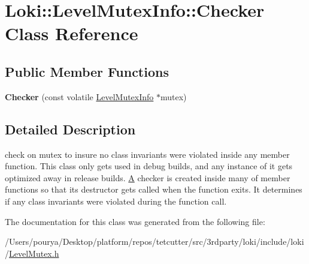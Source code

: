 \hypertarget{classLoki_1_1LevelMutexInfo_1_1Checker}{}\section{Loki\+:\+:Level\+Mutex\+Info\+:\+:Checker Class Reference}
\label{classLoki_1_1LevelMutexInfo_1_1Checker}
\subsection*{Public Member Functions}
\begin{DoxyCompactItemize}
\item 
\hypertarget{classLoki_1_1LevelMutexInfo_1_1Checker_a6f9ea9304ed3c44caf6e8553b77bd21c}{}{\bfseries Checker} (const volatile \hyperlink{classLoki_1_1LevelMutexInfo}{Level\+Mutex\+Info} $\ast$mutex)\label{classLoki_1_1LevelMutexInfo_1_1Checker_a6f9ea9304ed3c44caf6e8553b77bd21c}

\end{DoxyCompactItemize}


\subsection{Detailed Description}
check on mutex to insure no class invariants were violated inside any member function. This class only gets used in debug builds, and any instance of it gets optimized away in release builds. \hyperlink{structA}{A} checker is created inside many of member functions so that it\textquotesingle{}s destructor gets called when the function exits. It determines if any class invariants were violated during the function call. 

The documentation for this class was generated from the following file\+:\begin{DoxyCompactItemize}
\item 
/\+Users/pourya/\+Desktop/platform/repos/tetcutter/src/3rdparty/loki/include/loki/\hyperlink{LevelMutex_8h}{Level\+Mutex.\+h}\end{DoxyCompactItemize}
